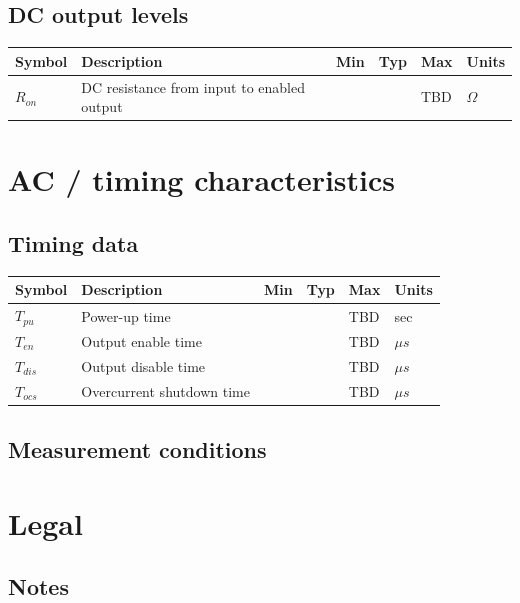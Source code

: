 \documentclass{article}
\begin{document}
\subsection{DC output levels}

\begin{longtable}{|l|p{2in}|p{0.5in}|p{0.65in}|p{0.65in}|p{0.5in}|}
\hline
{\bf Symbol} & {\bf Description} & {\bf Min} & {\bf Typ} & {\bf Max} & {\bf Units}\\
\hline
$R_{on}$ & DC resistance from input to enabled output & & & TBD & $\Omega$\\
\hline
\end{longtable}

\pagebreak
\section{AC / timing characteristics}

\subsection{Timing data}

\begin{longtable}{|l|p{2in}|p{0.5in}|p{0.65in}|p{0.65in}|p{0.5in}|}
\hline
{\bf Symbol} & {\bf Description} & {\bf Min} & {\bf Typ} & {\bf Max} & {\bf Units}\\
\hline
$T_{pu}$ & Power-up time & & & TBD & sec\\
\hline
$T_{en}$ & Output enable time & & & TBD & $\mu s$\\
\hline
$T_{dis}$ & Output disable time & & & TBD & $\mu s$\\
\hline
$T_{ocs}$ & Overcurrent shutdown time & & & TBD & $\mu s$\\
\hline
\end{longtable}

\subsection{Measurement conditions}

\pagebreak
\section{Legal}

\subsection{Notes}
\end{document}
